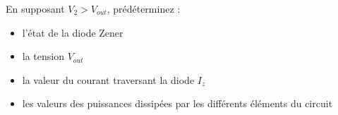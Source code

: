 \documentclass{../template/labo}
\begin{document}
%
%
%

\Question
{
	En supposant $V_2>V_{out}$, prédéterminez :
	\begin{itemize}
	\item l'état de la diode Zener
	\item la tension $V_{out}$
	\item la valeur du courant traversant la diode $I_z$ %
	\item les valeurs des puissances dissipées par les différents éléments du circuit
	\end{itemize}
}
{}%
	\label{Q:21}
\end{document}
